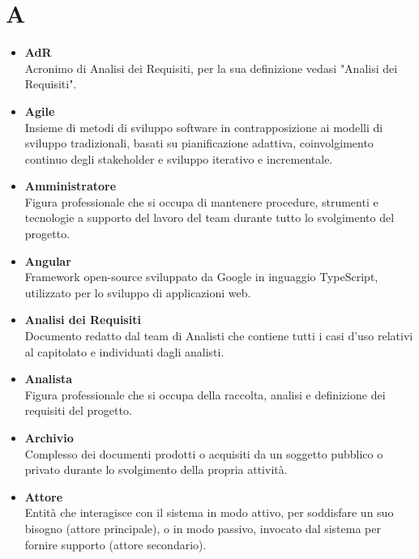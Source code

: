 \documentclass[a4paper,12pt]{article}
\begin{document}
        \section*{A} {
            \begin{itemize}
                \item \textbf{AdR}\\
                    Acronimo di Analisi dei Requisiti, per la sua definizione vedasi "Analisi dei Requisiti".
                \item \textbf{Agile}\\
                    Insieme di metodi di sviluppo software in contrapposizione ai modelli di sviluppo tradizionali, basati su pianificazione adattiva, coinvolgimento continuo degli stakeholder e sviluppo iterativo e incrementale.
                \item \textbf{Amministratore}\\
                    Figura professionale che si occupa di mantenere procedure, strumenti e tecnologie a supporto del lavoro del team durante tutto lo svolgimento del progetto.
                \item \textbf{Angular}\\
                    Framework open-source sviluppato da Google in inguaggio TypeScript, utilizzato per lo sviluppo di applicazioni web.
                \item \textbf{Analisi dei Requisiti}\\
                    Documento redatto dal team di Analisti che contiene tutti i casi d'uso relativi al capitolato e individuati dagli analisti.
                \item \textbf{Analista}\\
                    Figura professionale che si occupa della raccolta, analisi e definizione dei requisiti del progetto.
                \item \textbf{Archivio}\\
                    Complesso dei documenti prodotti o acquisiti da un soggetto pubblico o privato durante lo svolgimento della propria attività.
                \item \textbf{Attore}\\
                    Entità che interagisce con il sistema in modo attivo, per soddisfare un suo bisogno (attore principale), o in modo passivo, invocato dal sistema per fornire supporto (attore secondario).
            \end{itemize}
        }
        \newpage
\end{document}
